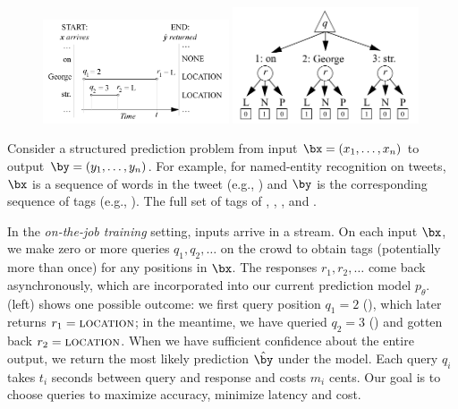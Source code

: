 \begin{figure}[t]
  \begin{centering}
  \includegraphics[width=0.49\textwidth]{figures/piano-roll.pdf}
  \hfill
 \includegraphics[width=0.49\textwidth,height=0.23\textheight,keepaspectratio]{figures/single-move.pdf}
  \end{centering}
  \caption{
  }
\label{fig:piano-roll}
\end{figure}

Consider a structured prediction problem from input $\bx = (x_1, \dots, x_n)$ to output $\by = (y_1, \dots, y_n)$.
For example, for named-entity recognition on tweets,
$\bx$ is a sequence of words in the tweet (e.g., )
and $\by$ is the corresponding sequence of tags (e.g., \scnone{} \scloc{} \scloc{}).
The full set of tags of \scper{}, \scloc{}, \scres{}, and \scnone{}.

In the \emph{on-the-job training} setting, inputs arrive in a stream.
On each input $\bx$,
we make zero or more queries $q_1, q_2, \dots$ on the crowd to obtain tags
(potentially more than once)
for any positions in $\bx$.
The responses $r_1, r_2, \dots$ come back asynchronously,
which are incorporated into our current prediction model $p_\theta$.
(left) shows one possible outcome:
we first query position $q_1 = 2$ (), which later returns $r_1 = \textsc{location}$;
in the meantime, we have queried $q_2=3$ () and gotten back $r_2 = \textsc{location}$.
When we have sufficient confidence about the entire output,
we return the most likely prediction $\hat \by$ under the model.
Each query $q_i$ takes $t_i$ seconds between query and response and costs $m_i$ cents.
Our goal is to choose queries to maximize accuracy, minimize latency and cost.

